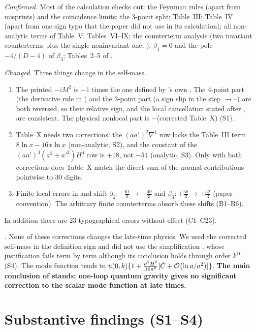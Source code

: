 \emph{Confirmed.} Most of the calculation checks out: the Feynman rules (apart from misprints) and the coincidence limits; the 3-point split;
Table~III; Table~IV (apart from one sign typo that the paper did not use in its calculation); all non-analytic terms of Table~V; Tables~VI--IX;
the counterterm analysis (two invariant counterterms plus the single noninvariant one, ); $\beta_1=0$ and the pole $-4/(D-4)$ of
$\beta_3$; Tables~2--5 of \PII.

\emph{Changed.} Three things change in the self-mass.
\begin{enumerate}[leftmargin=18pt,itemsep=1pt]
\item The printed $-iM^2$ is $-1$ times the one defined by \PI's own . The 4-point part (the derivative rule in ) and the 3-point part
(a sign slip in the step $\to$--) are both reversed, so their relative sign, and the local cancellation stated after
, are consistent. The physical nonlocal part is $-$(corrected Table~X) (S1).
\item Table~X needs two corrections: the $(aa')^2\nabla^4$ row lacks the Table~III term $8\ln x-16x\ln x$ (non-analytic, S2), and the constant of the
$(aa')^3(a^2+a'^2)H^4$ row is $+18$, not $-54$ (analytic, S3). Only with both corrections does Table~X match the direct sum of the normal
contributions pointwise to 30 digits.
\item Finite local errors in  and  shift $\beta_2:-\tfrac{61}{3}\to-\tfrac{49}{3}$ and $\beta_3:+\tfrac{58}{3}\to+\tfrac{52}{3}$
(paper convention). The arbitrary finite counterterms absorb these shifts (B1--B6).
\end{enumerate}
In addition there are 23 typographical errors without effect (C1--C23).

\emph{\PII.} None of these corrections changes the late-time physics. We used the corrected self-mass in the definition sign and did not use the
simplification , whose justification fails term by term although its conclusion holds through order $k^{10}$ (S4). The mode function tends to
$u(0,k)\{1+\frac{\kappa^2H^2}{16\pi^2}[\tilde C+\mathcal{O}\!\left(\ln a/a^2\right)]\}$. \textbf{The main conclusion of \PII{} stands: one-loop quantum gravity gives no
significant correction to the scalar mode function at late times.}

\section{Substantive findings (S1--S4)}
\label{sec:sum-subst}

